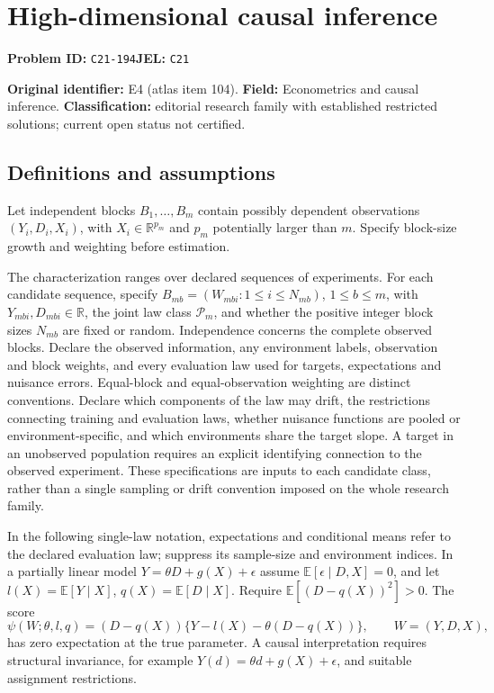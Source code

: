 \documentclass[11pt,a4paper]{article}
\begin{document}
\section*{High-dimensional causal inference}
\textbf{Problem ID:} \texttt{C21-194}\quad \textbf{JEL:} \texttt{C21}\par
\label{problem:OP-0104}
\label{atlas:prob:E4}

\noindent\textbf{Original identifier:} E4 (atlas item 104). \textbf{Field:} Econometrics and causal inference. \textbf{Classification:} editorial research family with established restricted solutions; current open status not certified.

\subsection*{Definitions and assumptions}

Let independent blocks $B_1,\ldots,B_m$ contain possibly dependent observations $(Y_i,D_i,X_i)$, with $X_i\in\mathbb R^{p_m}$ and $p_m$ potentially larger than $m$. Specify block-size growth and weighting before estimation.

The characterization ranges over declared sequences of experiments. For each candidate sequence, specify $B_{mb}=(W_{mbi}:1\leq i\leq N_{mb})$, $1\leq b\leq m$, with $Y_{mbi},D_{mbi}\in\mathbb R$, the joint law class $\mathcal P_m$, and whether the positive integer block sizes $N_{mb}$ are fixed or random. Independence concerns the complete observed blocks. Declare the observed information, any environment labels, observation and block weights, and every evaluation law used for targets, expectations and nuisance errors. Equal-block and equal-observation weighting are distinct conventions. Declare which components of the law may drift, the restrictions connecting training and evaluation laws, whether nuisance functions are pooled or environment-specific, and which environments share the target slope. A target in an unobserved population requires an explicit identifying connection to the observed experiment. These specifications are inputs to each candidate class, rather than a single sampling or drift convention imposed on the whole research family.

In the following single-law notation, expectations and conditional means refer to the declared evaluation law; suppress its sample-size and environment indices. In a partially linear model $Y=\theta D+g(X)+\epsilon$ assume $\mathbb E[\epsilon\mid D,X]=0$, and let $l(X)=\mathbb E[Y\mid X]$, $q(X)=\mathbb E[D\mid X]$. Require $\mathbb E[(D-q(X))^2]>0$. The score
\[
\psi(W;\theta,l,q)=(D-q(X))\{Y-l(X)-\theta(D-q(X))\},
\qquad W=(Y,D,X),
\]
has zero expectation at the true parameter. A causal interpretation requires structural invariance, for example $Y(d)=\theta d+g(X)+\epsilon$, and suitable assignment restrictions.
\end{document}
